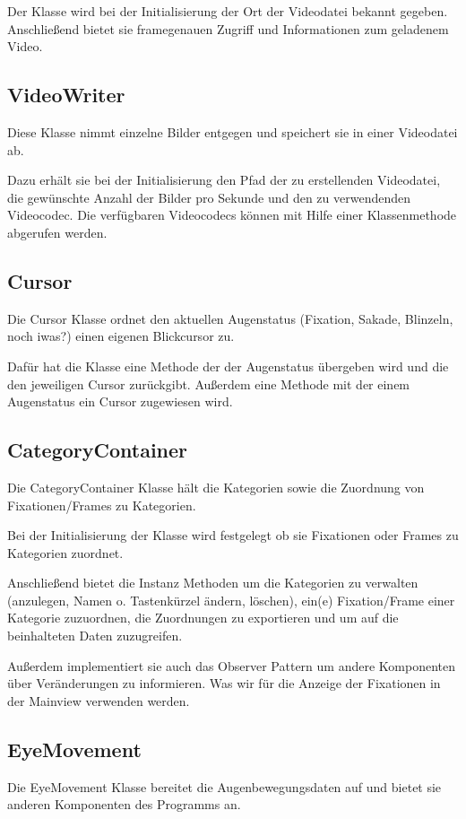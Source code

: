 \documentclass[a4paper,draft]{scrartcl}
\begin{document}
Der Klasse wird bei der Initialisierung der Ort der Videodatei bekannt gegeben.
Anschließend bietet sie framegenauen Zugriff und Informationen zum geladenem Video.

\subsection{VideoWriter}
Diese Klasse nimmt einzelne Bilder entgegen und speichert sie in einer Videodatei ab.

Dazu erhält sie bei der Initialisierung den Pfad der zu erstellenden Videodatei, die gewünschte Anzahl der Bilder pro Sekunde und den zu verwendenden Videocodec.
Die verfügbaren Videocodecs können mit Hilfe einer Klassenmethode abgerufen werden.

\subsection{Cursor}
Die Cursor Klasse ordnet den aktuellen Augenstatus (Fixation, Sakade, Blinzeln, noch iwas?) einen eigenen Blickcursor zu.

Dafür hat die Klasse eine Methode der der Augenstatus übergeben wird und die den jeweiligen Cursor zurückgibt. Außerdem eine Methode mit der einem Augenstatus ein Cursor zugewiesen wird.

\subsection{CategoryContainer}
Die CategoryContainer Klasse hält die Kategorien sowie die Zuordnung von Fixationen/Frames zu Kategorien.

Bei der Initialisierung der Klasse wird festgelegt ob sie Fixationen oder Frames zu Kategorien zuordnet.

Anschließend bietet die Instanz Methoden um die Kategorien zu verwalten (anzulegen, Namen o. Tastenkürzel ändern, löschen), ein(e) Fixation/Frame einer Kategorie zuzuordnen, die Zuordnungen zu exportieren und um auf die beinhalteten Daten zuzugreifen.

Außerdem implementiert sie auch das Observer Pattern um andere Komponenten über Veränderungen zu informieren. Was wir für die Anzeige der Fixationen in der Mainview verwenden werden.

\subsection{EyeMovement}
Die EyeMovement Klasse bereitet die Augenbewegungsdaten auf und bietet sie anderen Komponenten des Programms an.
\end{document}
